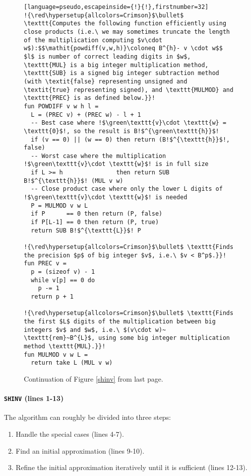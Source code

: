 \begin{figure}
\begin{lstlisting}[language=pseudo,escapeinside={!}{!},firstnumber=32]
!{\red\hypersetup{allcolors=Crimson}$\bullet$ \texttt{Computes the following function efficiently using close products (i.e.\ we may sometimes truncate the length of the multiplication computing $v\cdot w$):$$\mathit{powdiff(v,w,h)}\coloneq B^{h}- v \cdot w$$ $l$ is number of correct leading digits in $w$, \texttt{MUL} is a big integer multiplication method, \texttt{SUB} is a signed big integer subtraction method (with \textit{false} representing unsigned and \textit{true} representing signed), and \texttt{MULMOD} and \texttt{PREC} is as defined below.}}!
fun POWDIFF v w h l =
  L = (PREC v) + (PREC w) - l + 1
  -- Best case where !$\green\texttt{v}\cdot \texttt{w} = \texttt{0}$!, so the result is B!$^{\green\texttt{h}}$!
  if (v == 0) || (w == 0) then return (B!$^{\texttt{h}}$!, false)
  -- Worst case where the multiplication !$\green\texttt{v}\cdot \texttt{w}$! is in full size
  if L >= h               then return SUB B!$^{\texttt{h}}$! (MUL v w)
  -- Close product case where only the lower L digits of !$\green\texttt{v}\cdot \texttt{w}$! is needed
  P = MULMOD v w L
  if P      == 0 then return (P, false)
  if P[L-1] == 0 then return (P, true)
  return SUB B!$^{\texttt{L}}$! P

!{\red\hypersetup{allcolors=Crimson}$\bullet$ \texttt{Finds the precision $p$ of big integer $v$, i.e.\ $v < B^p$.}}!
fun PREC v =
  p = (sizeof v) - 1
  while v[p] == 0 do
    p -= 1
  return p + 1

!{\red\hypersetup{allcolors=Crimson}$\bullet$ \texttt{Finds the first $L$ digits of the multiplication between big integers $v$ and $w$, i.e.\ $(v\cdot w)~ \texttt{rem}~B^{L}$, using some big integer multiplication method \texttt{MUL}.}}!
fun MULMOD v w L =
  return take L (MUL v w)
\end{lstlisting}
  \caption{\footnotesize Continuation of Figure \ref{shinv} from last page.}
  \label{shinvcont}
\end{figure}

\paragraph{\texttt{SHINV} (lines 1-13)}
The algorithm can roughly be divided into three steps:
\begin{enumerate}[label=\Roman*]
\item Handle the special cases (lines 4-7).\label{shinvI}
\item Find an initial approximation (lines 9-10).\label{shinvII}
\item Refine the initial approximation iteratively until it is sufficient (lines 12-13).\label{shinvIII}
\end{enumerate}

